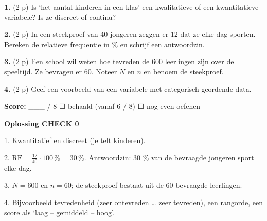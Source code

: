 \textbf{1.} (2 p) Is ‘het aantal kinderen in een klas’ een kwalitatieve of een kwantitatieve variabele? Is ze discreet of continu? \lijn

\textbf{2.} (2 p) In een steekproef van 40 jongeren zeggen er 12 dat ze elke dag sporten. Bereken de relatieve frequentie in \% en schrijf een antwoordzin. \lijn

\textbf{3.} (2 p) Een school wil weten hoe tevreden de 600 leerlingen zijn over de speeltijd. Ze bevragen er 60. Noteer $N$ en $n$ en benoem de steekproef. \lijn

\textbf{4.} (2 p) Geef een voorbeeld van een variabele met categorisch geordende data. \lijn

\begin{doel}
\textbf{Score:} \_\_\_ / 8 \quad ☐ behaald (vanaf 6 / 8) \quad ☐ nog even oefenen
\end{doel}

\begin{oplossing}
\textbf{Oplossing CHECK 0}

1. Kwantitatief en discreet (je telt kinderen). 

2. $\text{RF} = \frac{12}{40}\cdot 100\,\% = 30\,\%$. Antwoordzin: 30 \% van de bevraagde jongeren sport elke dag.

3. $N = 600$ en $n = 60$; de steekproef bestaat uit de 60 bevraagde leerlingen.

4. Bijvoorbeeld tevredenheid (zeer ontevreden … zeer tevreden), een rangorde, een score als ‘laag – gemiddeld – hoog’.
\end{oplossing}
